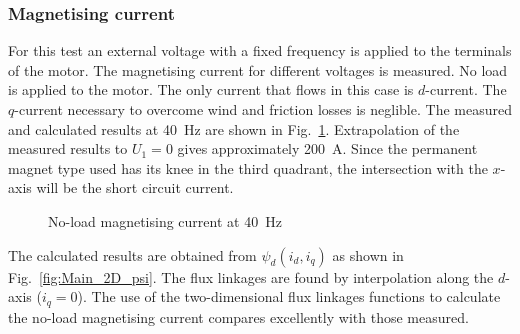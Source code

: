 \subsubsection{Magnetising current}
For this test an external voltage with a fixed frequency is applied to the terminals of the motor. The magnetising current for different voltages is measured. No load is applied to the motor. The only current that flows in this case is $d$-current. The $q$-current necessary to overcome wind and friction losses is neglible. The measured and calculated results at \SI{40}{Hz} are shown in Fig.~\ref{fig:magnetising_current}. Extrapolation of the measured results to $U_1=0$ gives approximately \SI{200}{A}. Since the permanent magnet type used has its knee in the third quadrant, the intersection with the $x$-axis will be the short circuit current.    
\begin{figure}[htbp]
	\centering
		
	\caption{No-load magnetising current at \SI{40}{Hz}}
	\label{fig:magnetising_current}
\end{figure}

The calculated results are obtained from $\psi_d(i_d,i_q)$ as shown in Fig.~\ref{fig:Main_2D_psi}. The flux linkages are found by interpolation along the $d$-axis ($i_q=0$). The use of the two-dimensional flux linkages functions to calculate the no-load magnetising current compares excellently with those measured.  

